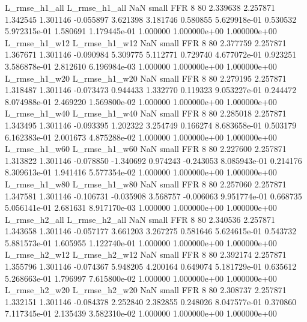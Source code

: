  L_rmse_h1_all  L_rmse_h1_all                   NaN      small      FFR                 8 80 2.339638       2.257871 1.342545       1.301146   -0.055897      3.621398      3.181746     0.580855   5.629918e-01  0.530532 5.972315e-01     1.580691   1.179445e-01            1.000000    1.000000e+00        1.000000e+00
 L_rmse_h1_w12  L_rmse_h1_w12                   NaN      small      FFR                 8 80 2.377759       2.257871 1.367671       1.301146   -0.090984      5.309775      5.112771     0.729740   4.677072e-01  0.923251 3.586878e-01     2.812610   6.196984e-03            1.000000    1.000000e+00        1.000000e+00
 L_rmse_h1_w20  L_rmse_h1_w20                   NaN      small      FFR                 8 80 2.279195       2.257871 1.318487       1.301146   -0.073473      0.944433      1.332770     0.119323   9.053227e-01  0.244472 8.074988e-01     2.469220   1.569800e-02            1.000000    1.000000e+00        1.000000e+00
 L_rmse_h1_w40  L_rmse_h1_w40                   NaN      small      FFR                 8 80 2.285018       2.257871 1.343495       1.301146   -0.093395      1.202322      3.254749     0.166274   8.683658e-01  0.503179 6.162383e-01     2.001673   4.875288e-02            1.000000    1.000000e+00        1.000000e+00
 L_rmse_h1_w60  L_rmse_h1_w60                   NaN      small      FFR                 8 80 2.227600       2.257871 1.313822       1.301146   -0.078850     -1.340692      0.974243    -0.243053   8.085943e-01  0.214176 8.309613e-01     1.941416   5.577354e-02            1.000000    1.000000e+00        1.000000e+00
 L_rmse_h1_w80  L_rmse_h1_w80                   NaN      small      FFR                 8 80 2.257060       2.257871 1.347581       1.301146   -0.106731     -0.035908      3.568757    -0.006063   9.951774e-01  0.668735 5.056141e-01     2.681631   8.917170e-03            1.000000    1.000000e+00        1.000000e+00
 L_rmse_h2_all  L_rmse_h2_all                   NaN      small      FFR                 8 80 2.340536       2.257871 1.343658       1.301146   -0.057177      3.661203      3.267275     0.581646   5.624615e-01  0.543732 5.881573e-01     1.605955   1.122740e-01            1.000000    1.000000e+00        1.000000e+00
 L_rmse_h2_w12  L_rmse_h2_w12                   NaN      small      FFR                 8 80 2.392174       2.257871 1.355796       1.301146   -0.074367      5.948205      4.200164     0.649074   5.181729e-01  0.635612 5.268663e-01     1.796997   7.615800e-02            1.000000    1.000000e+00        1.000000e+00
 L_rmse_h2_w20  L_rmse_h2_w20                   NaN      small      FFR                 8 80 2.308737       2.257871 1.332151       1.301146   -0.084378      2.252840      2.382855     0.248026   8.047577e-01  0.370860 7.117345e-01     2.135439   3.582310e-02            1.000000    1.000000e+00        1.000000e+00
